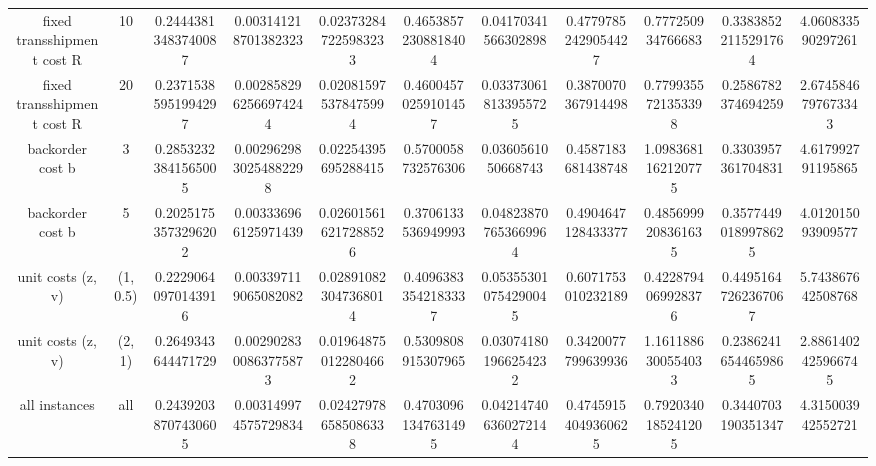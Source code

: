 \begin{table}[H]
\begin{tabular}{ccccccccccc}
fixed transshipment cost R & 10 & 0.24443813483740087 & 0.003141218701382323 & 0.023732847225983233 & 0.46538572308818404 & 0.04170341566302898 & 0.47797852429054427 & 0.777250934766683 & 0.33838522115291764 & 4.060833590297261 \\
fixed transshipment cost R & 20 & 0.23715385951994297 & 0.0028582962566974244 & 0.020815975378475994 & 0.46004570259101457 & 0.033730618133955725 & 0.3870070367914498 & 0.7799355721353398 & 0.2586782374694259 & 2.6745846797673343 \\
backorder cost b & 3 & 0.28532323841565005 & 0.0029629830254882298 & 0.02254395695288415 & 0.5700058732576306 & 0.0360561050668743 & 0.4587183681438748 & 1.0983681162120775 & 0.3303957361704831 & 4.617992791195865 \\
backorder cost b & 5 & 0.20251753573296202 & 0.003336966125971439 & 0.026015616217288526 & 0.3706133536949993 & 0.048238707653669964 & 0.4904647128433377 & 0.4856999208361635 & 0.35774490189978625 & 4.012015093909577 \\
unit costs (z, v) & (1, 0.5) & 0.22290640970143916 & 0.003397119065082082 & 0.028910823047368014 & 0.40963833542183337 & 0.053553010754290045 & 0.6071753010232189 & 0.4228794069928376 & 0.44951647262367067 & 5.743867642508768 \\
unit costs (z, v) & (2, 1) & 0.2649343644471729 & 0.0029028300863775873 & 0.019648750122804662 & 0.5309808915307965 & 0.030741801966254232 & 0.3420077799639936 & 1.1611886300554033 & 0.23862416544659865 & 2.8861402425966745 \\
all instances & all & 0.24392038707430605 & 0.003149974575729834 & 0.024279786585086338 & 0.47030961347631495 & 0.042147406360272144 & 0.47459154049360625 & 0.7920340185241205 & 0.3440703190351347 & 4.315003942552721 \\
\bottomrule
\end{tabular}
\end{table}